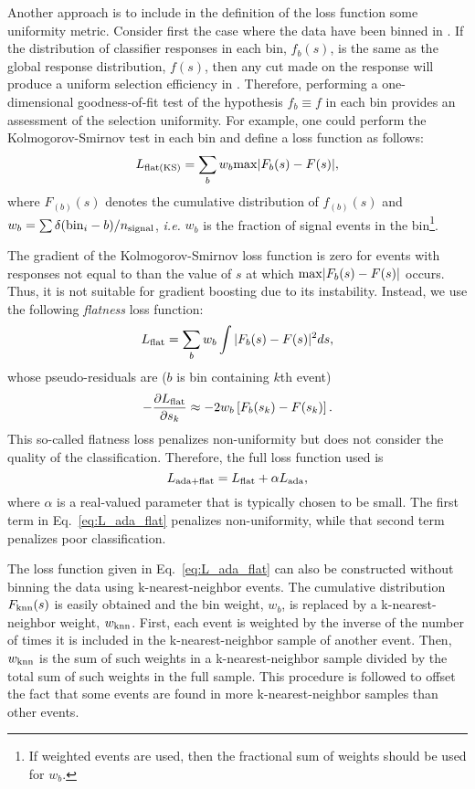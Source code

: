 Another approach is to include in the definition of the loss function some uniformity metric.  Consider first the case where the data have been binned in \y.  If the distribution of classifier responses in each bin, $f_b(s)$, is the same as the global response distribution, $f(s)$, then any cut made on the response will produce a uniform selection efficiency in \y.  Therefore, performing a one-dimensional goodness-of-fit test of the hypothesis $f_b \equiv f$ in each bin provides an assessment of the selection uniformity.  
For example, one could perform the Kolmogorov-Smirnov test in each bin and define a loss function as follows:
\begin{equation}
  L_{\rm flat(KS)} = \sum\limits_{b} w_b {\rm max}|F_b(s)-F(s)|,
\end{equation}
where $F_{(b)}(s)$ denotes the cumulative distribution of $f_{(b)}(s)$ and $w_b = \sum \delta({\rm bin}_i - b)/n_{\rm signal}$, {\em i.e.} $w_b$ is the fraction of signal events in the bin\footnote{If weighted events are used, then the fractional sum of weights should be used for $w_b$.}.   

The gradient of the Kolmogorov-Smirnov loss function is zero for events with responses not equal to than the value of $s$ at which ${\rm max}|F_b(s)-F(s)|$ occurs.  Thus, it is not suitable for gradient boosting due to its instability.  Instead, we use the following {\em flatness} loss function:
\begin{equation}
  L_{\rm flat} = \sum\limits_{b} w_b \int |F_b(s)-F(s)|^2 ds,
\end{equation}
whose pseudo-residuals are ($b$ is bin containing $k$th event)
\begin{equation}
 -\frac{\partial L_{\rm flat}}{\partial s_k} \approx - 2 w_b \left[F_b(s_k)-F(s_k)\right] .
\end{equation}
This so-called flatness loss penalizes non-uniformity but does not consider the quality of the classification.  Therefore, the full loss function used is 
\begin{equation}
\label{eq:L_ada_flat}
  L_{{\rm ada}+{\rm flat}} = L_{\rm flat} + \alpha L_{\rm ada},
\end{equation}  
where $\alpha$ is a real-valued parameter that is typically chosen to be small.  The first term in Eq.~\ref{eq:L_ada_flat} penalizes non-uniformity, while that second term penalizes poor classification.  

The loss function given in Eq.~\ref{eq:L_ada_flat} can also be constructed without binning the data using k-nearest-neighbor events.  
The cumulative distribution $F_{\rm knn}(s)$ is easily obtained and the bin weight, $w_b$, is replaced by a k-nearest-neighbor weight, $w_{\rm knn}$.  First, each event is weighted by the inverse of the number of times it is included in the k-nearest-neighbor sample of another event.  Then, $w_{\rm knn}$ is the sum of such weights in a k-nearest-neighbor sample divided by the total sum of such weights in the full sample.   This procedure is followed to offset the fact that some events are found in more k-nearest-neighbor samples than other events.  
